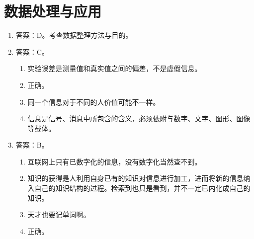 \section{数据处理与应用}

\begin{enumerate}
\item 答案：D。考查数据整理方法与目的。

\item 答案：C。
	\begin{enumerate}[label=\Alph*.]
	\item 实验误差是测量值和真实值之间的偏差，不是虚假信息。
	\item 正确。
	\item 同一个信息对于不同的人价值可能不一样。
	\item 信息是信号、消息中所包含的含义，必须依附与数字、文字、图形、图像等载体。
	\end{enumerate}

\item 答案：B。
	\begin{enumerate}[label=\Alph*.]
	\item 互联网上只有已数字化的信息，没有数字化当然查不到。
	\item 知识的获得是人利用自身已有的知识对信息进行加工，进而将新的信息纳入自己的知识结构的过程。检索到也只是看到，并不一定已内化成自己的知识。
	\item 天才也要记单词啊。
	\item 正确。
	\end{enumerate}


\end{enumerate}

